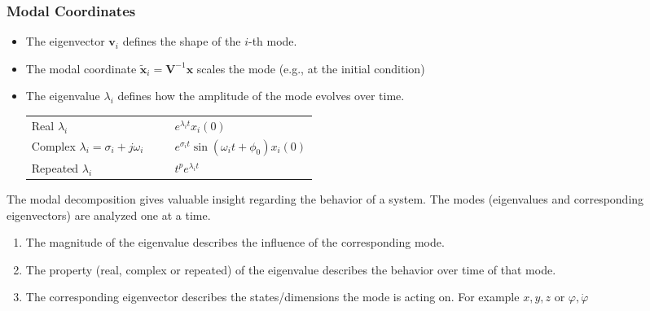\subsubsection{Modal Coordinates}
\begin{itemize}
    \item The eigenvector $\mathbf{v}_i$ defines the shape of the $i$-th mode.
    \item The modal coordinate $\tilde{\mathbf{x}}_i=\mathbf{V}^{-1}\mathbf{x}$ scales the mode (e.g., at the initial condition)
    \item The eigenvalue $\lambda_i$ defines how the amplitude of the mode evolves over time.

          \begin{tabularx}{\linewidth}{@{}p{0.5\linewidth}X@{}}
              \quad Real $\lambda_i$                            & \textrightarrow{} $e^{\lambda_i t}x_i(0)$                         \\
              \quad Complex $\lambda_i = \sigma_i + j \omega_i$ & \textrightarrow{} $e^{\sigma_i t}\sin(\omega_i t + \phi_0)x_i(0)$ \\
              \quad Repeated $\lambda_i$                        & \textrightarrow{} $t^p e^{\lambda_i t}$
          \end{tabularx}
\end{itemize}

\begin{examplesection}
    The modal decomposition gives valuable insight regarding the behavior of a system. The modes (eigenvalues and corresponding eigenvectors) are analyzed one at a time.
    \begin{enumerate}
        \item The magnitude of the eigenvalue describes the influence of the corresponding mode.
        \item The property (real, complex or repeated) of the eigenvalue describes the behavior over time of that mode.
        \item The corresponding eigenvector describes the states/dimensions the mode is acting on. For example $x,y,z$ or $\varphi, \dot{\varphi}$
    \end{enumerate}
\end{examplesection}

